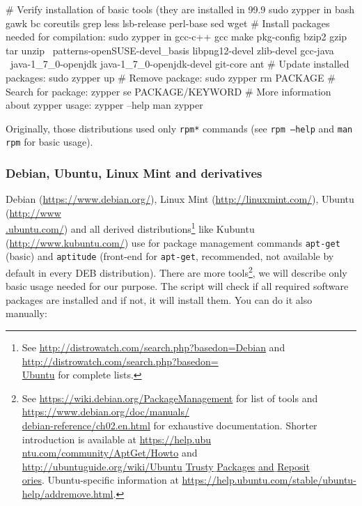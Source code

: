 \documentclass[a4paper, 11pt, twoside]{article}
\begin{document}
\begin{bashcode}
  # Verify installation of basic tools (they are installed in 99.9%
  sudo zypper in bash gawk bc coreutils grep less lsb-release perl-base sed wget
  # Install packages needed for compilation:
  sudo zypper in gcc-c++ gcc make pkg-config bzip2 gzip tar unzip \
    patterns-openSUSE-devel_basis libpng12-devel zlib-devel gcc-java \
    java-1_7_0-openjdk java-1_7_0-openjdk-devel git-core ant
  # Update installed packages:
  sudo zypper up
  # Remove package:
  sudo zypper rm PACKAGE
  # Search for package:
  zypper se PACKAGE/KEYWORD
  # More information about zypper usage:
  zypper --help
  man zypper
\end{bashcode}

Originally, those distributions used only \texttt{rpm*} commands (see \texttt{rpm --help} and \texttt{man rpm} for basic usage).

\subsubsection{Debian, Ubuntu, Linux Mint and derivatives}

Debian (\href{https://www.debian.org/}{https://www.debian.org/}), Linux Mint (\href{http://linuxmint.com/}{http://linuxmint.com/}), Ubuntu (\href{http://www.ubuntu.com/}{http://www\\.ubuntu.com/}) and all derived distributions\footnote{See \href{http://distrowatch.com/search.php?basedon=Debian}{http://distrowatch.com/search.php?basedon=Debian} and \href{http://distrowatch.com/search.php?basedon=Ubuntu}{http://distrowatch.com/search.php?basedon=\\Ubuntu} for complete lists.} like Kubuntu (\href{http://www.kubuntu.com/}{http://www.kubuntu.com/}) use for package management commands \texttt{apt-get} (basic) and \texttt{aptitude} (front-end for \texttt{apt-get}, recommended, not available by default in every DEB distribution). There are more tools\footnote{See \href{https://wiki.debian.org/PackageManagement}{https://wiki.debian.org/PackageManagement} for list of tools and \href{https://www.debian.org/doc/manuals/debian-reference/ch02.en.html}{https://www.debian.org/doc/manuals/\\debian-reference/ch02.en.html} for exhaustive documentation. Shorter introduction is available at \href{https://help.ubuntu.com/community/AptGet/Howto}{https://help.ubu\\ntu.com/community/AptGet/Howto} and \href{http://ubuntuguide.org/wiki/Ubuntu_Trusty_Packages_and_Repositories}{http://ubuntuguide.org/wiki/Ubuntu$\_$Trusty$\_$Packages$\_$and$\_$Reposit\\ories}. Ubuntu-specific information at \href{https://help.ubuntu.com/stable/ubuntu-help/addremove.html}{https://help.ubuntu.com/stable/ubuntu-help/addremove.html}.}, we will describe only basic usage needed for our purpose. The script will check if all required software packages are installed and if not, it will install them. You can do it also manually:
\end{document}
